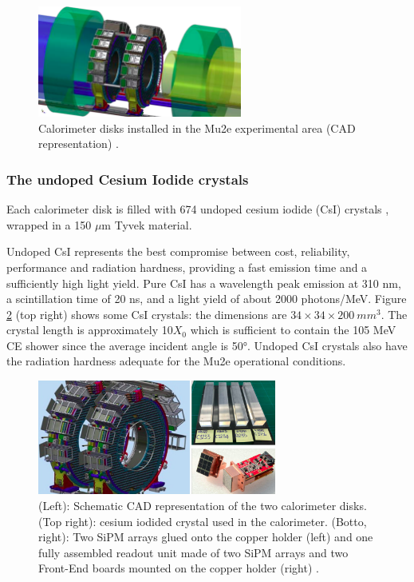 \begin{figure}[!h]
    \centering
    \includegraphics[width =0.6\textwidth]{figures/png/Screenshot_20240322_122050.png}
    \caption[CAD representation of the calorimeter disks.]{Calorimeter disks installed in the Mu2e experimental area (CAD representation) \cite{em7}.}
    \label{fig:calo1}
\end{figure}



\subsubsection{The undoped Cesium Iodide crystals}
Each calorimeter disk is filled with 674 undoped cesium 
iodide (CsI) crystals \cite{em6}, wrapped in a 150 $\mu$m Tyvek material.

Undoped CsI represents the best compromise between cost, 
reliability, performance and radiation hardness, providing 
a fast emission time and a sufficiently high light yield. Pure 
CsI has a wavelength peak emission at 310 nm, a scintillation 
time of 20 ns, and a light yield of about 2000 photons/MeV. 
Figure \ref{fig:calo2} (top right) shows some CsI crystals: 
the dimensions are $34 \times 34 \times 200 \ mm^3$. The crystal length 
is approximately 10$X_0$ which is sufficient to contain the 105 
MeV CE shower since the average incident angle 
is 50°. Undoped CsI crystals also have the radiation hardness 
adequate for the Mu2e operational conditions. 




\begin{figure}[!h]
    \centering
    \includegraphics[width =0.7\textwidth]{figures/png/Screenshot_20240322_121000.png}
    \caption[The calorimeter components.]{(Left): Schematic CAD representation of the two calorimeter disks. (Top right): 
    cesium iodided crystal used in the calorimeter. (Botto, right): Two SiPM arrays 
    glued onto the copper holder (left) and one fully assembled readout unit made of two 
    SiPM arrays and two Front-End boards mounted on the copper holder (right) \cite{em4}.}
    \label{fig:calo2}
\end{figure}



